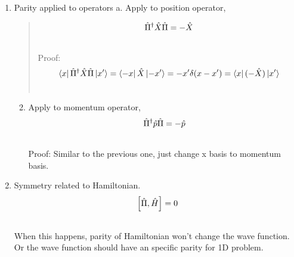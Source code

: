 \documentclass[letterpaper,10pt,english]{sphinxmanual}
\begin{document}
\begin{enumerate}
\item {} 
Parity applied to operators
a. Apply to position operator,
\begin{quote}
\begin{gather}
\begin{split}\hat \Pi^\dagger \hat X \hat \Pi = -\hat X\end{split}\notag\\\begin{split}\end{split}\notag
\end{gather}
Proof:
\begin{gather}
\begin{split}\bra{x}\hat \Pi ^\dagger \hat X \hat \Pi \ket{x'} = \bra{-x}\hat X \ket{-x'}= -x'\delta(x-x') = \bra{x}(-\hat X)\ket{x'}\end{split}\notag\\\begin{split}\end{split}\notag
\end{gather}\end{quote}
\begin{enumerate}
\setcounter{enumi}{1}
\item {} 
Apply to momentum operator,
\begin{gather}
\begin{split}\hat \Pi^\dagger \hat p \hat \Pi = -\hat p\end{split}\notag\\\begin{split}\end{split}\notag
\end{gather}
Proof: Similar to the previous one, just change x basis to momentum basis.

\end{enumerate}

\item {} 
Symmetry related to Hamiltonian.
\begin{gather}
\begin{split}\left[ \hat \Pi , \hat H  \right] = 0\end{split}\notag\\\begin{split}\end{split}\notag
\end{gather}
When this happens, parity of Hamiltonian won't change the wave function. Or the wave function should have an specific parity for 1D problem.

\end{enumerate}
\end{document}
